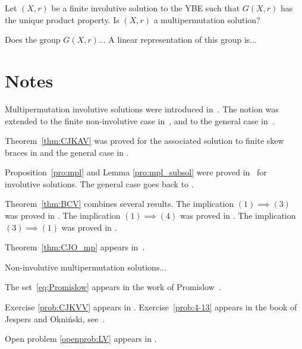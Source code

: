 \begin{problem}\label{openprob:LV}
    Let $(X,r)$ be a finite involutive solution to the YBE such that $G(X,r)$ has the unique product property. Is $(X,r)$ a multipermutation solution?
\end{problem}

\begin{problem}
    Does the group $G(X,r)$...
    A linear representation of this group is...
\end{problem}

\section{Notes}

Multipermutation involutive solutions were introduced in~\cite{MR1722951}. 
The notion was extended to the finite non-involutive case in~\cite{MR3974961}, and to the general case in~\cite{MR4457900}.

Theorem~\ref{thm:CJKAV} was proved for the associated solution to finite skew braces in \cite{MR3763907} and the general case in \cite{MR4457900}. %

Proposition~\ref{pro:mpl} and Lemma \ref{pro:mpl_subsol} were proved in~\cite{MR3177933} 
for involutive solutions. The general case goes back to \cite{MR4457900}. 

Theorem~\ref{thm:BCV} combines several results. The implication $(1)\implies (3)$ was proved in \cite{MR2189580}. The implication $(1)\implies (4)$ was proved in \cite{MR3572046}. The implication $(3)\implies (1)$ was proved in \cite{MR3815290}. 

Theorem~\ref{thm:CJO_mp} appears in~\cite{MR3177933}. 

Non-involutive multipermutation solutions...

The set~\eqref{eq:Promislow} appears in the work of Promislow~\cite{MR940281}.

Exercise \ref{prob:CJKVV} appears in \cite{MR4457900}. 
Exercise~\ref{prob:4-13} appears in the book of Jespers and Okni\'nski, see~\cite[Example 8.2.14]{MR2301033}. 

Open problem \ref{openprob:LV} appears in \cite{MR3974961}.

